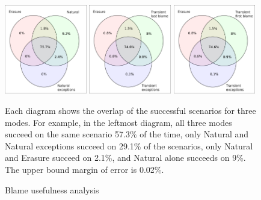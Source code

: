 \begin{figure}\footnotesize 
  \centering
  \includegraphics[width=0.32\textwidth]{./plots/TR-TR-stack-first-venn}
  \hfill
  \includegraphics[width=0.32\textwidth]{./plots/transient-newest-transient-stack-first-venn}
  \hfill
  \includegraphics[width=0.32\textwidth]{./plots/transient-oldest-transient-stack-first-venn}

  \vspace{1em}
  \begin{minipage}{0.95\textwidth}

     Each diagram shows the overlap of the successful scenarios for three modes.
     For example, in the leftmost diagram, all three modes succeed on the same
     scenario 57.3\% of the time, only Natural and Natural exceptions succeed on
     29.1\% of the scenarios, only Natural and Erasure succeed on 2.1\%, and
     Natural alone succeeds on 9\%. The upper bound margin of error is 0.02\%.

  \end{minipage}

  \caption{Blame usefulness analysis}
  \label{fig:success-venns}
\end{figure}


